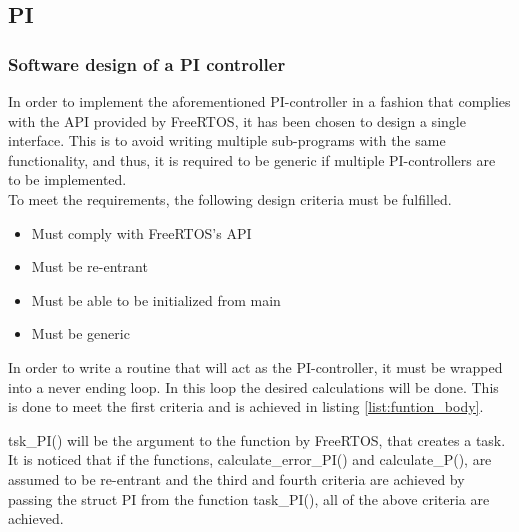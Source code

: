 \documentclass[../../../main]{subfiles}
\begin{document}
\lstset{basicstyle=\tt\scriptsize}


\subsection{PI}

\subsubsection{Software design of a PI controller}
In order to implement the aforementioned PI-controller in a fashion that complies with the API provided by FreeRTOS, it has been chosen to design a single interface.
This is to avoid writing multiple sub-programs with the same functionality, and thus, it is required to be generic if multiple PI-controllers are to be implemented.
\\

To meet the requirements, the following design criteria must be fulfilled.

\begin{itemize}
  \item Must comply with FreeRTOS's API
  \item Must be re-entrant
  \item Must be able to be initialized from main
  \item Must be generic
\end{itemize}

In order to write a routine that will act as the PI-controller, it must be wrapped into a never ending loop.
In this loop the desired calculations will be done. This is done to meet the first criteria and is achieved in listing \ref{list:funtion_body}.





tsk\_PI() will be the argument to the function by FreeRTOS, that creates a task.
It is noticed that if the functions, calculate\_error\_PI() and calculate\_P(), are assumed to be re-entrant and the third and fourth criteria are achieved by passing the struct PI from the function task\_PI(), all of the above criteria are achieved.
\\
\end{document}
